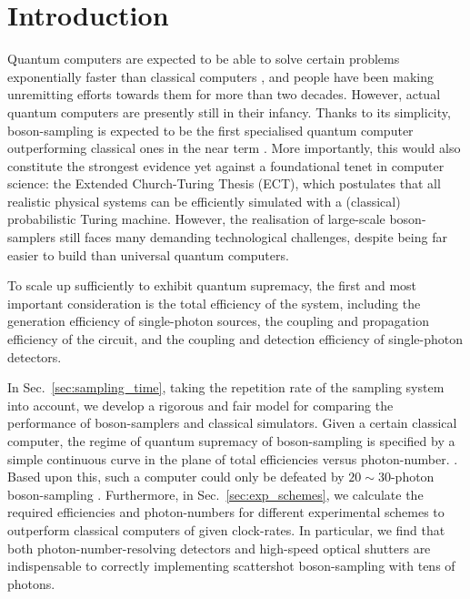 \documentclass[aps,rmp,twocolumn,amsmath,amssymb,nofootinbib,superscriptaddress]{revtex4}
\newcommand{\comment}[1]{{\color{blue}{#1}}}
\begin{document}
\tableofcontents

\section{Introduction} \label{sec:introduction}

Quantum computers are expected to be able to solve certain problems exponentially faster than classical computers \cite{bib:1}, and people have been making unremitting efforts towards them for more than two decades. However, actual quantum computers are presently still in their infancy. Thanks to its simplicity, boson-sampling is expected to be the first specialised quantum computer outperforming classical ones in the near term \cite{bib:2}. More importantly, this would also constitute the strongest evidence yet against a foundational tenet in computer science: the Extended Church-Turing Thesis (ECT), which postulates that all realistic physical systems can be efficiently simulated with a (classical) probabilistic Turing machine. However, the realisation of large-scale boson-samplers still faces many demanding technological challenges, despite being far easier to build than universal quantum computers.

To scale up sufficiently to exhibit quantum supremacy, the first and most important consideration is the total efficiency of the system, including the generation efficiency of single-photon sources, the coupling and propagation efficiency of the circuit, and the coupling and detection efficiency of single-photon detectors.

In Sec.~\ref{sec:sampling_time}, taking the repetition rate of the sampling system into account, we develop a rigorous and fair model for comparing the performance of boson-samplers and classical simulators. Given a certain classical computer, the regime of quantum supremacy of boson-sampling is specified by a simple continuous curve in the plane of total efficiencies versus photon-number. \comment{To our surprise, there is such a (optimal) turning point in this curve where four-photon boson-samplers with repetition rates of 76MHz could beat present commodity computers with GHz clock-rates}. Based upon this, such a computer could only be defeated by \mbox{$20\sim 30$}-photon boson-sampling \cite{bib:2, bib:3}. Furthermore, in Sec.~\ref{sec:exp_schemes}, we calculate the required efficiencies and photon-numbers for different experimental schemes to outperform classical computers of given clock-rates. In particular, we find that both photon-number-resolving detectors and high-speed optical shutters are indispensable to correctly implementing scattershot boson-sampling with tens of photons.
\end{document}
